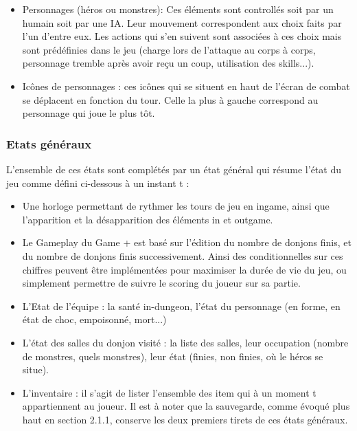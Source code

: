 \documentclass[a4paper,12pt]{article}
\begin{document}
\begin{itemize}
\item Personnages (héros ou monstres): Ces éléments sont controllés soit par un humain soit par une IA. Leur mouvement correspondent aux choix faits par l'un d'entre eux. Les actions qui s'en suivent sont associées à ces choix mais sont prédéfinies dans le jeu (charge lors de l'attaque au corps à corps, personnage tremble après avoir reçu un coup, utilisation des skills...).
\item Icônes de personnages : ces icônes qui se situent en haut de l'écran de combat se déplacent en fonction du tour. Celle la plus à gauche correspond au personnage qui joue le plus tôt.
\end{itemize}
\newpage
\subsubsection{Etats généraux}
L'ensemble de ces états sont complétés par un état général qui résume l'état du jeu comme défini ci-dessous à un instant t : 
\begin{itemize}
    \item Une horloge permettant de rythmer les tours de jeu en ingame, ainsi que l'apparition et la désapparition des éléments in et outgame. 
    \item Le Gameplay du Game + est basé sur l'édition du nombre de donjons finis,
et du nombre de donjons finis successivement. Ainsi des conditionnelles sur ces chiffres peuvent être implémentées pour maximiser la durée de vie du jeu, ou simplement permettre de suivre le scoring du joueur sur sa partie. 
    \item L'Etat de l'équipe : la santé in-dungeon, l'état du personnage (en forme, en état de choc, empoisonné, mort...)
    \item L'état des salles du donjon visité : la liste des salles, leur occupation (nombre de monstres, quels monstres), leur état (finies, non finies, où le héros se situe).
    \item L'inventaire : il s'agit de lister l'ensemble des item qui à un moment t appartiennent au joueur. 
Il est à noter que la sauvegarde, comme évoqué plus haut en section 2.1.1, conserve les deux premiers tirets de ces états généraux. 
\end{itemize}
\end{document}
